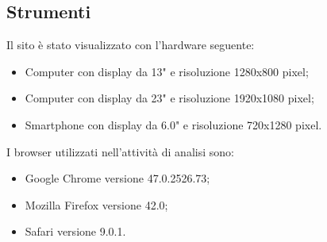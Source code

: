 \subsection{Strumenti}
\begin{flushleft}
Il sito è stato visualizzato con l'hardware seguente:
\end{flushleft}
\begin{itemize}
	\item Computer con display da 13" e risoluzione 1280x800 pixel;
	\item Computer con display da 23" e risoluzione 1920x1080 pixel;
	\item Smartphone con display da 6.0" e risoluzione 720x1280 pixel.
\end{itemize}
\begin{flushleft}
I browser utilizzati nell'attività di analisi sono:
\end{flushleft}
\begin{itemize}
	\item Google Chrome versione 47.0.2526.73;
	\item Mozilla Firefox versione 42.0;
	\item Safari versione 9.0.1.
\end{itemize}